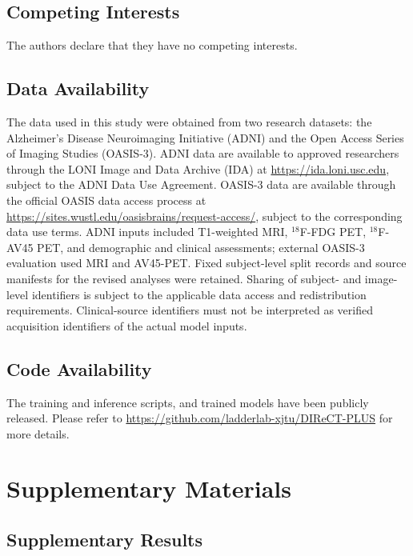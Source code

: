 \documentclass{article}
\begin{document}
\subsection*{Competing Interests}
The authors declare that they have no competing interests.

\subsection*{Data Availability}
The data used in this study were obtained from two research datasets: the Alzheimer's Disease Neuroimaging Initiative (ADNI) and the Open Access Series of Imaging Studies (OASIS-3). ADNI data are available to approved researchers through the LONI Image and Data Archive (IDA) at \url{https://ida.loni.usc.edu}, subject to the ADNI Data Use Agreement. OASIS-3 data are available through the official OASIS data access process at \url{https://sites.wustl.edu/oasisbrains/request-access/}, subject to the corresponding data use terms. ADNI inputs included T1-weighted MRI, $^{18}$F-FDG PET, $^{18}$F-AV45 PET, and demographic and clinical assessments; external OASIS-3 evaluation used MRI and AV45-PET. Fixed subject-level split records and source manifests for the revised analyses were retained. Sharing of subject- and image-level identifiers is subject to the applicable data access and redistribution requirements. Clinical-source identifiers must not be interpreted as verified acquisition identifiers of the actual model inputs.

\subsection*{Code Availability}
The training and inference scripts, and trained models have been publicly released. Please refer to \url{https://github.com/ladderlab-xjtu/DIReCT-PLUS} for more details.

\section*{Supplementary Materials}
\begingroup
\setcounter{figure}{0}
\renewcommand{\thefigure}{S\arabic{figure}}
\renewcommand{\theHfigure}{S\arabic{figure}}
\setcounter{table}{0}
\renewcommand{\thetable}{S\arabic{table}}
\renewcommand{\theHtable}{S\arabic{table}}

\subsection*{Supplementary Results}
\end{document}
